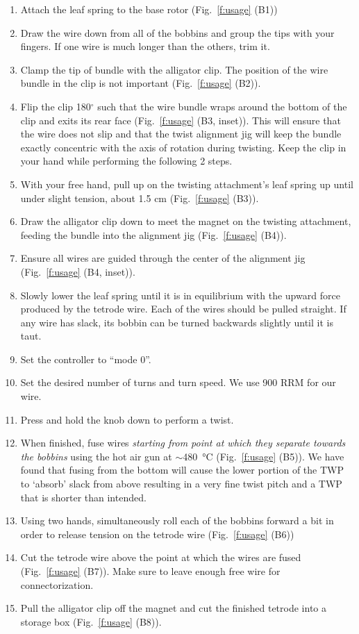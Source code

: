 \documentclass[11pt,a4paper]{article}
\begin{document}
\begin{enumerate}[noitemsep]
    \item Attach the leaf spring to the base rotor (Fig.~\ref{f:usage} (B1))
    \item Draw the wire down from all of the bobbins and group the tips with
        your fingers. If one wire is much longer than the others, trim it.
    \item Clamp the tip of bundle with the alligator clip. The position of the
        wire bundle in the clip is not important (Fig.~\ref{f:usage} (B2)).
    \item Flip the clip 180$^{\circ}$ such that the wire bundle wraps around the
        bottom of the clip and exits its rear face (Fig.~\ref{f:usage} (B3,
        inset)). This will ensure that the wire does not slip and that the
        twist alignment jig will keep the bundle exactly concentric with the
        axis of rotation during twisting.  Keep the clip in your hand while
        performing the following 2 steps.
    \item With your free hand, pull up on the twisting attachment's leaf spring
        up until under slight tension, about 1.5 cm (Fig.~\ref{f:usage} (B3)).
    \item Draw the alligator clip down to meet the magnet on the twisting
        attachment, feeding the bundle into the alignment jig (Fig.~\ref{f:usage} (B4)).
    \item Ensure all wires are guided through the center of the alignment jig
        (Fig.~\ref{f:usage} (B4, inset)).
    \item Slowly lower the leaf spring until it is in equilibrium with the
        upward force produced by the tetrode wire. Each of the wires should be
        pulled straight. If any wire has slack, its bobbin can be turned
        backwards slightly until it is taut.
    \item Set the controller to ``mode 0''.
    \item Set the desired number of turns and turn speed. We use 900 RRM for
        our wire.
    \item Press and hold the knob down to perform a twist.
    \item When finished, fuse wires \textit{starting from point at which they
        separate towards the bobbins} using the hot air gun at
        $\sim$\SI{480}{\celsius} (Fig.~\ref{f:usage} (B5)). We have found that
        fusing from the bottom will cause the lower portion of the TWP to
        `absorb' slack from above resulting in a very fine twist pitch and a
        TWP that is shorter than intended.
    \item Using two hands, simultaneously roll each of the bobbins forward a
        bit in order to release tension on the tetrode wire (Fig.~\ref{f:usage}
        (B6))
    \item Cut the tetrode wire above the point at which the wires are fused
        (Fig.~\ref{f:usage} (B7)). Make sure to leave enough free wire for
        connectorization.
    \item Pull the alligator clip off the magnet and cut the finished tetrode
        into a storage box (Fig.~\ref{f:usage} (B8)).
\end{enumerate}
\end{document}
